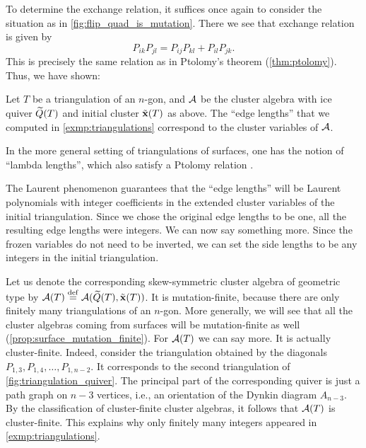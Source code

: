 To determine the exchange relation, it suffices once again to consider the situation as
in \cref{fig:flip_quad_is_mutation}. There we see that exchange relation is given by
\begin{equation}\label{eq:exchange_flip_quad}
	P_{ik}P_{jl} = P_{ij}P_{kl} + P_{il}P_{jk}.
\end{equation}
%
This is precisely the same relation as in Ptolomy's theorem (\cref{thm:ptolomy}). Thus,
we have shown:
\begin{proposition}

	Let $T$ be a triangulation of an $n$-gon, and $\mathcal{A}$ be the cluster algebra with ice
	quiver $\widetilde{Q}(T)$ and initial cluster $\tilde{\mathbf{x}}(T)$ as above. The ``edge lengths'' that we
	computed in \cref{exmp:triangulations} correspond to the cluster variables of $\mathcal{A}$.
\end{proposition}
\begin{remark}

	In the more general setting of triangulations of surfaces, one has the notion of
	``lambda lengths'', which also satisfy a Ptolomy relation \parencite[Proposition 7.6]{FominThurston2018CATriangulatedSurfacesII}.
\end{remark}

The Laurent phenomenon guarantees that the ``edge lengths'' will be Laurent polynomials
with integer coefficients in the extended cluster variables of the initial
triangulation. Since we chose the original edge lengths to be one, all the resulting
edge lengths were integers. We can now say something more. Since the frozen variables
do not need to be inverted, we can set the side lengths to be any integers in the
initial triangulation.

Let us denote the corresponding skew-symmetric cluster algebra of geometric type by
$\mathcal{A}(T) \overset{\mathrm{def}}{=} \mathcal{A}(\widetilde{Q}(T), \tilde{\mathbf{x}}(T))$. It is mutation-finite, because there are only
finitely many triangulations of an $n$-gon. More generally, we will see that all the
cluster algebras coming from surfaces will be mutation-finite as well
(\cref{prop:surface_mutation_finite}). For $\mathcal{A}(T)$ we can say more. It is actually
cluster-finite. Indeed, consider the triangulation obtained by the diagonals $P_{1, 3},
	P_{1,4}, \dots, P_{1,n-2}$. It corresponds to the second triangulation of
\cref{fig:triangulation_quiver}. The principal part of the corresponding quiver is just
a path graph on $n-3$ vertices, i.e., an orientation of the Dynkin diagram $A_{n-3}$.
By the classification of cluster-finite cluster algebras, it follows that $\mathcal{A}(T)$ is
cluster-finite. This explains why only finitely many integers appeared in
\cref{exmp:triangulations}.

